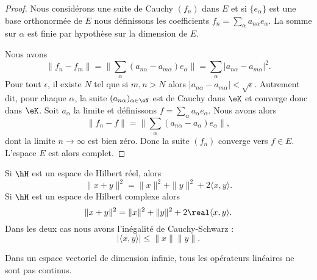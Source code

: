 \begin{proof}
    Nous considérons une suite de Cauchy \( (f_n)\) dans \( E\) et si \( \{ e_{\alpha} \} \) est une base orthonormée de \( E\) nous définissons les coefficients \( f_n=\sum_{\alpha}a_{n\alpha}e_{\alpha} \). La somme sur \( \alpha\) est finie par hypothèse sur la dimension de \( E\).

    Nous avons
    \begin{equation}
        \| f_n-f_m \|=\| \sum_{\alpha}(a_{n\alpha}-a_{m\alpha})e_{\alpha} \|=\sum_{\alpha}| a_{n\alpha}-a_{m\alpha} |^2.
    \end{equation}
    Pour tout \( \epsilon\), il existe \( N\) tel que si \( m,n>N\) alors \( | a_{n\alpha}-a_{m\alpha} |<\sqrt{ \epsilon }\). Autrement dit, pour chaque \( \alpha\), la suite \( (a_{n\alpha})_{\alpha\in \eN}\) est de Cauchy dans \( \eK\) et converge donc dans \( \eK\). Soit \( a_{\alpha}\) la limite et définissons \( f=\sum_{\alpha}a_{\alpha}e_{\alpha}\). Nous avons alors
    \begin{equation}
        \| f_n-f \|=\| \sum_{\alpha}(a_{n\alpha}-a_{\alpha})e_{\alpha} \|,
    \end{equation}
    dont la limite \( n\to \infty\) est bien zéro. Donc la suite \( (f_n)\) converge vers \( f\in E\). L'espace \( E\) est alors complet.
\end{proof}

\begin{proposition}     \label{PropTdupIG}
    Si \( \hH\) est un espace de Hilbert réel, alors
    \begin{equation}
        \| x+y \|^2=\| x \|^2+\| y \|^2+2\langle x, y\rangle .
    \end{equation}
    Si \( \hH\) est un espace de Hilbert complexe alors
    \begin{equation}        \label{EqrbBlkK}
        \| x+y \|^2=\| x \|^2+\| y \|^2+2\real\langle x, y\rangle .
    \end{equation}
    Dans les deux cas nous avons l'inégalité de Cauchy-Schwarz :
    \begin{equation}
        | \langle x, y\rangle  |\leq \| x \|\| y \|.
    \end{equation}
\end{proposition}

Dans un espace vectoriel de dimension infinie, tous les opérateurs linéaires ne sont pas continus.

